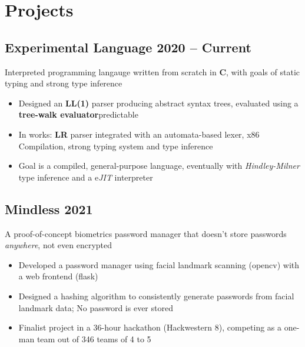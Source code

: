 \documentclass[9pt]{article}
\begin{document}
\section*{Projects}

\subsection{Experimental Language \hfill \normalsize\textnormal{2020 -- Current}}
Interpreted programming langauge written from scratch in \textbf{C}, with goals of static typing and strong type inference
\vspace{-0.5em}
\begin{itemize}
  \item Designed an \textbf{LL(1)} parser producing abstract syntax trees, evaluated using a \textbf{tree-walk evaluator}predictable  
    \item In works: \textbf{LR} parser integrated with an automata-based lexer, x86 Compilation, strong typing system and type inference
    \item Goal is a compiled, general-purpose language, eventually with \textit{Hindley-Milner} type inference and a e\textit{JIT} interpreter 
\end{itemize}

\subsection{Mindless \hfill \normalsize\textnormal{2021}}
    A proof-of-concept biometrics password manager that doesn't store passwords \textit{anywhere}, not even encrypted
\vspace{-0.5em}
\begin{itemize}
    \item Developed a password manager using facial landmark scanning (opencv) with a web frontend (flask)
    \item Designed a hashing algorithm to consistently  generate passwords from facial landmark data; No password is ever stored
    \item Finalist project in a 36-hour hackathon (Hackwestern 8), competing as a one-man team out of 346 teams of 4 to 5
\end{itemize}
\end{document}
